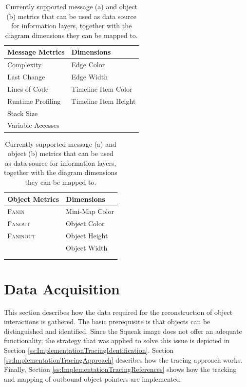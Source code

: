 \begin{table}[tb]
	\centering
	\footnotesize
	\begin{subtable}[t]{0.45\textwidth}
		\begin{tabular}{ll}
		\toprule[1.2pt]
		Message Metrics		& Dimensions 			\\
		\midrule
		Complexity			& Edge Color 			\\
		Last Change			& Edge Width			\\
		Lines of Code		& Timeline Item Color	\\
		Runtime Profiling	& Timeline Item Height	\\
		Stack Size			&						\\
		Variable Accesses	&						\\
		\bottomrule[1.2pt]
		\end{tabular}
		\caption[Message Metrics]{}
	\end{subtable}
	\qquad
	\begin{subtable}[t]{0.45\textwidth}
		\begin{tabular}{ll}
		\toprule[1.2pt]
		Object Metrics		& Dimensions 			\\
		\midrule
		\textsc{Fanin}		& Mini-Map Color		\\
		\textsc{Fanout}		& Object Color			\\
		\textsc{Faninout}	& Object Height			\\
		\hphantom{Runtime Profiling}	& Object Width			\\
							& \hphantom{Timeline Item Height} \\
							& \\
		\bottomrule[1.2pt]
		\end{tabular}
		\caption[Object Metrics]{}
	\end{subtable}
	\caption[Information Layers: Supported Metrics and Diagram Dimensions]{Currently supported message (a) and object (b) metrics that can be used as data source for information layers, together with the diagram dimensions they can be mapped to.}
	\label{t:ImplementationLayers}
\label{t:EvaluationProjects}
\end{table}


\section{Data Acquisition}
\label{s:ImplementationTracing}
This section describes how the data required for the reconstruction of object interactions is gathered.
The basic prerequisite is that objects can be distinguished and identified.
Since the Squeak image does not offer an adequate functionality, the strategy that was applied to solve this issue is depicted in Section \ref{ss:ImplementationTracingIdentification}.
Section \ref{ss:ImplementationTracingApproach} describes how the tracing approach works.
Finally, Section \ref{ss:ImplementationTracingReferences} shows how the tracking and mapping of outbound object pointers are implemented.

